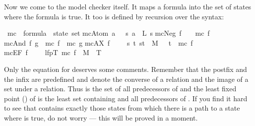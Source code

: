 \begin{isabellebody}
\begin{isamarkuptext}
Now we come to the model checker itself. It maps a formula into the set of
states where the formula is true.  It too is defined by recursion over the syntax:%
\end{isamarkuptext}%
\isamarkuptrue%
\ mc\ {\isacharcolon}{\isacharcolon}\ {\isachardoublequote}formula\ {\isasymRightarrow}\ state\ set{\isachardoublequote}\isanewline
\isamarkupfalse%
\isanewline
{\isachardoublequote}mc{\isacharparenleft}Atom\ a{\isacharparenright}\ \ {\isacharequal}\ {\isacharbraceleft}s{\isachardot}\ a\ {\isasymin}\ L\ s{\isacharbraceright}{\isachardoublequote}\isanewline
{\isachardoublequote}mc{\isacharparenleft}Neg\ f{\isacharparenright}\ \ \ {\isacharequal}\ {\isacharminus}mc\ f{\isachardoublequote}\isanewline
{\isachardoublequote}mc{\isacharparenleft}And\ f\ g{\isacharparenright}\ {\isacharequal}\ mc\ f\ {\isasyminter}\ mc\ g{\isachardoublequote}\isanewline
{\isachardoublequote}mc{\isacharparenleft}AX\ f{\isacharparenright}\ \ \ \ {\isacharequal}\ {\isacharbraceleft}s{\isachardot}\ {\isasymforall}t{\isachardot}\ {\isacharparenleft}s{\isacharcomma}t{\isacharparenright}\ {\isasymin}\ M\ \ {\isasymlongrightarrow}\ t\ {\isasymin}\ mc\ f{\isacharbraceright}{\isachardoublequote}\isanewline
{\isachardoublequote}mc{\isacharparenleft}EF\ f{\isacharparenright}\ \ \ \ {\isacharequal}\ lfp{\isacharparenleft}{\isasymlambda}T{\isachardot}\ mc\ f\ {\isasymunion}\ {\isacharparenleft}M{\isasyminverse}\ {\isacharbackquote}{\isacharbackquote}\ T{\isacharparenright}{\isacharparenright}{\isachardoublequote}\isamarkupfalse%
%
\begin{isamarkuptext}%
\noindent
Only the equation for  deserves some comments. Remember that the
postfix \isa{{\isasyminverse}} and the infix \isa{{\isacharbackquote}{\isacharbackquote}} are predefined and denote the
converse of a relation and the image of a set under a relation.  Thus
 is the set of all predecessors of  and the least
fixed point () of  is the least set
 containing  and all predecessors of . If you
find it hard to see that  contains exactly those states from
which there is a path to a state where  is true, do not worry --- this
will be proved in a moment.


\end{isamarkuptext}
\end{isabellebody}
